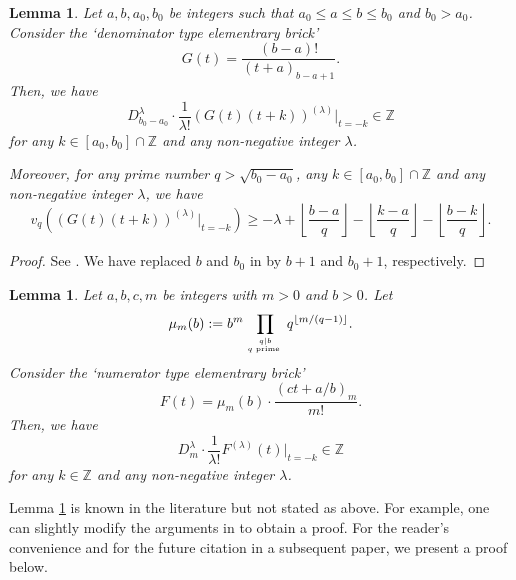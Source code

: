 \documentclass[12pt]{article}
\newtheorem{lemma}[theorem]{Lemma}
\numberwithin{equation}{section}
\begin{document}
\bigskip

\begin{lemma}\label{lem_G}
Let $a,b,a_0,b_0$ be integers such that $a_0 \leqslant a \leqslant b \leqslant b_0$ and $b_0 > a_0$. Consider the `denominator type elementrary brick'
\[ G(t) = \frac{(b-a)!}{(t+a)_{b-a+1}}. \]
Then, we have
\begin{equation}\label{lem_G_1}
D_{b_0-a_0}^{\lambda} \cdot \frac{1}{\lambda!} \left( G(t)(t+k) \right)^{(\lambda)} \big|_{t=-k} \in \mathbb{Z}
\end{equation} 
for any $k \in [a_0,b_0]\cap \mathbb{Z}$ and any non-negative integer $\lambda$. 

Moreover, for any prime number $q > \sqrt{b_0-a_0}$, any $k \in [a_0,b_0]\cap \mathbb{Z}$ and any non-negative integer $\lambda$, we have
\begin{equation}\label{lem_G_2}
v_q\left( \left( G(t)(t+k) \right)^{(\lambda)} \big|_{t=-k} \right) \geqslant -\lambda + \left\lfloor \frac{b-a}{q} \right\rfloor - \left\lfloor \frac{k-a}{q} \right\rfloor - \left\lfloor \frac{b-k}{q} \right\rfloor. 
\end{equation}
\end{lemma}

\begin{proof}
See \cite[Lemmas 16,~18]{Zud2004}. We have replaced $b$ and $b_0$ in \cite[Lemma 16,~18]{Zud2004} by $b+1$ and $b_0+1$, respectively. 
\end{proof}

\bigskip

\begin{lemma}\label{lem_F}
Let $a,b,c,m$ be integers with $m > 0$ and $b>0$. Let 
\[ \mu_m(b) := b^{m} \prod_{q \mid b \atop q \text{~prime~}} q^{\lfloor m/(q-1) \rfloor}. \] 
Consider the `numerator type elementrary brick'
\[ F(t) = \mu_m(b) \cdot \frac{(ct+a/b)_m}{m!}. \]
Then, we have
\[D_{m}^{\lambda} \cdot \frac{1}{\lambda!}  F^{(\lambda)}(t)  \big|_{t=-k} \in \mathbb{Z}  \]
for any $k \in \mathbb{Z}$ and any non-negative integer $\lambda$.
\end{lemma}

Lemma \ref{lem_F} is known in the literature but not stated as above. For example, one can slightly modify the arguments in \cite[Proposition 3.2]{LY2020} to obtain a proof. For the reader's convenience and for the future citation in a subsequent paper, we present a proof below.
\end{document}
